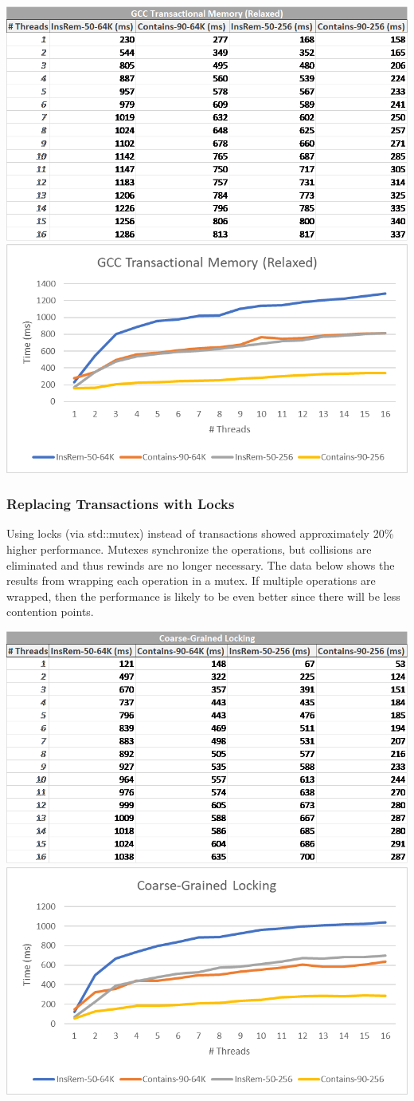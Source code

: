 \documentclass[11pt]{article} %
\begin{document}
\bigskip
\includegraphics[width=0.5\linewidth]{Table4.png}
\includegraphics[width=0.5\linewidth]{Graph4.png}

\subsubsection{Replacing Transactions with Locks}

Using locks (via std::mutex) instead of transactions showed approximately 20\% higher performance. Mutexes synchronize the operations, but collisions are eliminated and thus rewinds are no longer necessary. The data below shows the results from wrapping each operation in a mutex. If multiple operations are wrapped, then the performance is likely to be even better since there will be less contention points.

\bigskip
\includegraphics[width=0.5\linewidth]{Table5.png}
\includegraphics[width=0.5\linewidth]{Graph5.png}
\end{document}
